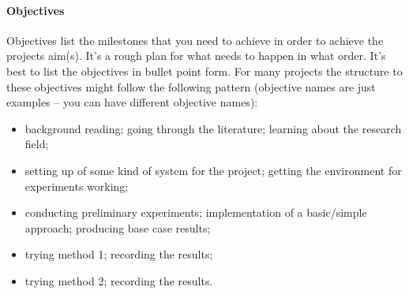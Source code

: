 \documentclass[12pt]{article}
\begin{document}
\paragraph{Objectives}
Objectives list the milestones that you need to achieve in order to achieve the projects aim(s). It's a rough plan for what needs to happen in what order. It's best to list the objectives in bullet point form. For many projects the structure to these objectives might follow the following pattern (objective names are just examples -- you can have different objective names):    
\begin{itemize}[noitemsep]
\item background reading; going through the literature; learning about the research field;
\item setting up of some kind of system for the project; getting the environment for experiments working;
\item conducting preliminary experiments; implementation of a basic/simple approach; producing base case results;
\item trying method 1; recording the results;
\item trying method 2; recording the results.
\end{itemize}

\end{document}
